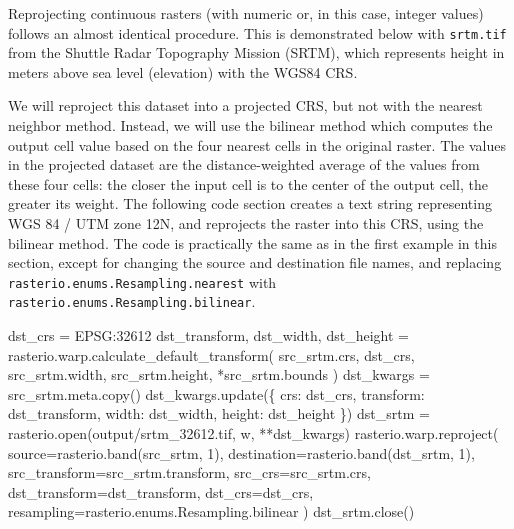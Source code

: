 \documentclass[
  letterpaper,
]{krantz}
\newenvironment{Shaded}{\begin{snugshade}}{\end{snugshade}}
\newcommand{\BuiltInTok}[1]{\textcolor[rgb]{0.00,0.23,0.31}{#1}}
\newcommand{\DecValTok}[1]{\textcolor[rgb]{0.68,0.00,0.00}{#1}}
\newcommand{\NormalTok}[1]{\textcolor[rgb]{0.00,0.23,0.31}{#1}}
\newcommand{\OperatorTok}[1]{\textcolor[rgb]{0.37,0.37,0.37}{#1}}
\newcommand{\StringTok}[1]{\textcolor[rgb]{0.13,0.47,0.30}{#1}}
\begin{document}
Reprojecting continuous rasters (with numeric or, in this case, integer
values) follows an almost identical procedure. This is demonstrated
below with \texttt{srtm.tif} from the Shuttle Radar Topography Mission
(SRTM), which represents height in meters above sea level (elevation)
with the WGS84 CRS.

We will reproject this dataset into a projected CRS, but not with the
nearest neighbor method. Instead, we will use the bilinear method which
computes the output cell value based on the four nearest cells in the
original raster. The values in the projected dataset are the
distance-weighted average of the values from these four cells: the
closer the input cell is to the center of the output cell, the greater
its weight. The following code section creates a text string
representing WGS 84 / UTM zone 12N, and reprojects the raster into this
CRS, using the bilinear method. The code is practically the same as in
the first example in this section, except for changing the source and
destination file names, and replacing
\texttt{rasterio.enums.Resampling.nearest} with
\texttt{rasterio.enums.Resampling.bilinear}.

\begin{Shaded}
\begin{Highlighting}[]
\NormalTok{dst\_crs }\OperatorTok{=} \StringTok{\textquotesingle{}EPSG:32612\textquotesingle{}}
\NormalTok{dst\_transform, dst\_width, dst\_height }\OperatorTok{=}\NormalTok{ rasterio.warp.calculate\_default\_transform(}
\NormalTok{    src\_srtm.crs,}
\NormalTok{    dst\_crs,}
\NormalTok{    src\_srtm.width,}
\NormalTok{    src\_srtm.height,}
    \OperatorTok{*}\NormalTok{src\_srtm.bounds}
\NormalTok{)}
\NormalTok{dst\_kwargs }\OperatorTok{=}\NormalTok{ src\_srtm.meta.copy()}
\NormalTok{dst\_kwargs.update(\{}
    \StringTok{\textquotesingle{}crs\textquotesingle{}}\NormalTok{: dst\_crs,}
    \StringTok{\textquotesingle{}transform\textquotesingle{}}\NormalTok{: dst\_transform,}
    \StringTok{\textquotesingle{}width\textquotesingle{}}\NormalTok{: dst\_width,}
    \StringTok{\textquotesingle{}height\textquotesingle{}}\NormalTok{: dst\_height}
\NormalTok{\})}
\NormalTok{dst\_srtm }\OperatorTok{=}\NormalTok{ rasterio.}\BuiltInTok{open}\NormalTok{(}\StringTok{\textquotesingle{}output/srtm\_32612.tif\textquotesingle{}}\NormalTok{, }\StringTok{\textquotesingle{}w\textquotesingle{}}\NormalTok{, }\OperatorTok{**}\NormalTok{dst\_kwargs)}
\NormalTok{rasterio.warp.reproject(}
\NormalTok{    source}\OperatorTok{=}\NormalTok{rasterio.band(src\_srtm, }\DecValTok{1}\NormalTok{),}
\NormalTok{    destination}\OperatorTok{=}\NormalTok{rasterio.band(dst\_srtm, }\DecValTok{1}\NormalTok{),}
\NormalTok{    src\_transform}\OperatorTok{=}\NormalTok{src\_srtm.transform,}
\NormalTok{    src\_crs}\OperatorTok{=}\NormalTok{src\_srtm.crs,}
\NormalTok{    dst\_transform}\OperatorTok{=}\NormalTok{dst\_transform,}
\NormalTok{    dst\_crs}\OperatorTok{=}\NormalTok{dst\_crs,}
\NormalTok{    resampling}\OperatorTok{=}\NormalTok{rasterio.enums.Resampling.bilinear}
\NormalTok{)}
\NormalTok{dst\_srtm.close()}
\end{Highlighting}
\end{Shaded}
\end{document}
